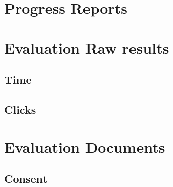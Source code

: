 \documentclass{l4proj}
\begin{document}
\begin{appendices}
	\chapter{Progress Reports}
	
	
	
	
	
	
	
	
	
	
	
	
	
	
	
	
	
	
	
	
	
	
	\chapter{Evaluation Raw results}
	\clearpage
	\begin{minipage}{\textwidth}
		\section{Time}
		
	\end{minipage}
	\clearpage
	\begin{minipage}{\textwidth}
		\section{Clicks}
		
	\end{minipage}
	\chapter{Evaluation Documents}
	\clearpage
	\begin{minipage}{\textwidth}
		\section{Consent}
		
	\end{minipage}
	\clearpage
	\begin{minipage}{\textwidth}

\end{minipage}
\end{appendices}
\end{document}
